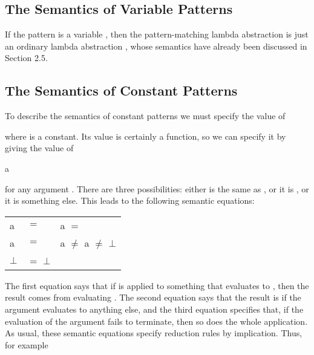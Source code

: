 \subsection{The Semantics of Variable Patterns}
If the pattern  is a variable , then the pattern-matching lambda abstraction  is just an ordinary lambda abstraction , whose semantics have already been discussed in Section 2.5.

\subsection{The Semantics of Constant Patterns}
To describe the semantics of constant patterns we must specify the value of

\begin{mlcoded}
\end{mlcoded}

where  is a constant. Its value is certainly a function, so we can specify it by giving the value of

\begin{mlcoded}
     a
\end{mlcoded}

for any argument . There are three possibilities: either  is the same as , or it is , or it is something else. This leads to the following semantic equations:

\begin{mlcoded}
    \begin{tabular}{lll}
        \metafnbb{Eval}{\tlb{k}E} a &$=$ \metafnbb{Eval}{E} & \text{if} a $=$ \metafnbb{Eval}{k} \\
    \metafnbb{Eval}{\tlb{k}E} a &$=$ \text{FAIL} & \text{if} a $\neq$ \metafnbb{Eval}{k} \text{and} a $\neq$ $\bot$ \\
    \metafnbb{Eval}{\tlb{k}E} $\bot$ &$=$ $\bot$
    \end{tabular}
\end{mlcoded}

The first equation says that if  is applied to something that evaluates to , then the result comes from evaluating . The second equation says that the result is  if the argument evaluates to anything else, and the third equation specifies that, if the evaluation of the argument fails to terminate, then so does the whole application. As usual, these semantic equations specify reduction rules by implication. Thus, for example

